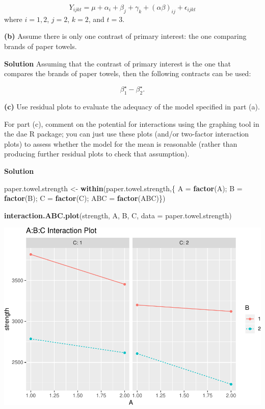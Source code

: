\documentclass[12pt,]{article}
\newenvironment{Shaded}{\begin{snugshade}}{\end{snugshade}}
\newcommand{\KeywordTok}[1]{\textcolor[rgb]{0.13,0.29,0.53}{\textbf{#1}}}
\newcommand{\DataTypeTok}[1]{\textcolor[rgb]{0.13,0.29,0.53}{#1}}
\newcommand{\StringTok}[1]{\textcolor[rgb]{0.31,0.60,0.02}{#1}}
\newcommand{\NormalTok}[1]{#1}
\begin{document}
\[
Y_{ijk t} = \mu + \alpha_i + \beta_j + \gamma_k + (\alpha \beta)_{ij} + \epsilon_{ijk t}
\] where \(i = 1, 2\), \(j = 2\), \(k= 2\), and \(t=3\).

\textbf{(b)} Assume there is only one contrast of primary interest: the
one comparing brands of paper towels.

\textbf{Solution} Assuming that the contrast of primary interest is the
one that compares the brands of paper towels, then the following
contracts can be used:

\[
\beta_1^\star -\beta_2^\star.
\]

\textbf{(c)} Use residual plots to evaluate the adequacy of the model
specified in part (a).

For part (c), comment on the potential for interactions using the
graphing tool in the dae R package; you can just use these plots (and/or
two-factor interaction plots) to assess whether the model for the mean
is reasonable (rather than producing further residual plots to check
that assumption).

\textbf{Solution}

\begin{Shaded}
\begin{Highlighting}[]
\NormalTok{paper.towel.strength <-}\StringTok{ }\KeywordTok{within}\NormalTok{(paper.towel.strength,\{}
\NormalTok{  A =}\StringTok{ }\KeywordTok{factor}\NormalTok{(A); B =}\StringTok{ }\KeywordTok{factor}\NormalTok{(B); C =}\StringTok{ }\KeywordTok{factor}\NormalTok{(C); ABC =}\StringTok{ }\KeywordTok{factor}\NormalTok{(ABC)\})}

\KeywordTok{interaction.ABC.plot}\NormalTok{(strength, A, B, C, }\DataTypeTok{data =}\NormalTok{ paper.towel.strength)}
\end{Highlighting}
\end{Shaded}

\includegraphics{Markdown_HW_7_files/figure-latex/unnamed-chunk-2-1.pdf}
\end{document}
